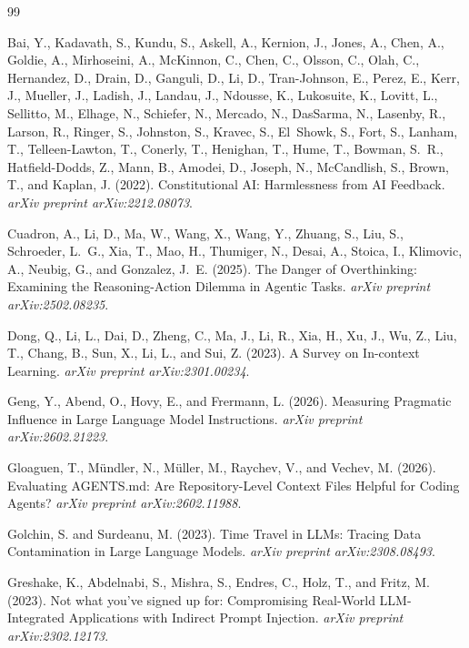 \documentclass[11pt,a4paper]{article}
\begin{document}
\begin{thebibliography}{99}

Bai, Y., Kadavath, S., Kundu, S., Askell, A., Kernion, J., Jones, A., Chen, A.,
  Goldie, A., Mirhoseini, A., McKinnon, C., Chen, C., Olsson, C., Olah, C.,
  Hernandez, D., Drain, D., Ganguli, D., Li, D., Tran-Johnson, E., Perez, E.,
  Kerr, J., Mueller, J., Ladish, J., Landau, J., Ndousse, K., Lukosuite, K.,
  Lovitt, L., Sellitto, M., Elhage, N., Schiefer, N., Mercado, N., DasSarma, N.,
  Lasenby, R., Larson, R., Ringer, S., Johnston, S., Kravec, S., El~Showk, S.,
  Fort, S., Lanham, T., Telleen-Lawton, T., Conerly, T., Henighan, T., Hume, T.,
  Bowman, S.~R., Hatfield-Dodds, Z., Mann, B., Amodei, D., Joseph, N.,
  McCandlish, S., Brown, T., and Kaplan, J. (2022).
\newblock Constitutional AI: Harmlessness from AI Feedback.
\newblock \emph{arXiv preprint arXiv:2212.08073}.

Cuadron, A., Li, D., Ma, W., Wang, X., Wang, Y., Zhuang, S., Liu, S., Schroeder, L.~G.,
  Xia, T., Mao, H., Thumiger, N., Desai, A., Stoica, I., Klimovic, A., Neubig, G.,
  and Gonzalez, J.~E. (2025).
\newblock The Danger of Overthinking: Examining the Reasoning-Action Dilemma in Agentic
  Tasks.
\newblock \emph{arXiv preprint arXiv:2502.08235}.

Dong, Q., Li, L., Dai, D., Zheng, C., Ma, J., Li, R., Xia, H., Xu, J., Wu, Z., Liu, T.,
  Chang, B., Sun, X., Li, L., and Sui, Z. (2023).
\newblock A Survey on In-context Learning.
\newblock \emph{arXiv preprint arXiv:2301.00234}.

Geng, Y., Abend, O., Hovy, E., and Frermann, L. (2026).
\newblock Measuring Pragmatic Influence in Large Language Model Instructions.
\newblock \emph{arXiv preprint arXiv:2602.21223}.

Gloaguen, T., Mündler, N., Müller, M., Raychev, V., and Vechev, M. (2026).
\newblock Evaluating AGENTS.md: Are Repository-Level Context Files Helpful for Coding
  Agents?
\newblock \emph{arXiv preprint arXiv:2602.11988}.

Golchin, S. and Surdeanu, M. (2023).
\newblock Time Travel in LLMs: Tracing Data Contamination in Large Language Models.
\newblock \emph{arXiv preprint arXiv:2308.08493}.

Greshake, K., Abdelnabi, S., Mishra, S., Endres, C., Holz, T., and Fritz, M. (2023).
\newblock Not what you've signed up for: Compromising Real-World LLM-Integrated
  Applications with Indirect Prompt Injection.
\newblock \emph{arXiv preprint arXiv:2302.12173}.


\end{thebibliography}
\end{document}

